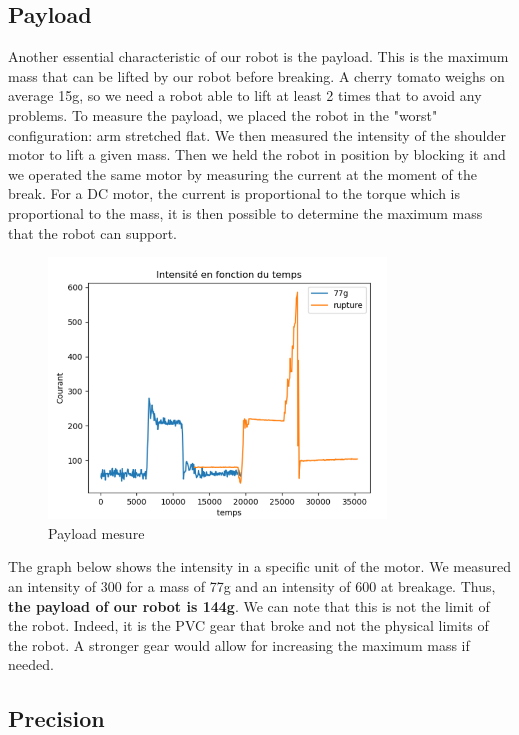 \subsection{Payload}

Another essential characteristic of our robot is the payload. This is the maximum mass that can be lifted by our robot before breaking. A cherry tomato weighs on average 15g, so we need a robot able to lift at least 2 times that to avoid any problems. To measure the payload, we placed the robot in the "worst" configuration: arm stretched flat. We then measured the intensity of the shoulder motor to lift a given mass. Then we held the robot in position by blocking it and we operated the same motor by measuring the current at the moment of the break. For a DC motor, the current is proportional to the torque which is proportional to the mass, it is then possible to determine the maximum mass that the robot can support. 
\begin{figure}[ht]
    \centering
    \includegraphics[width=0.8\textwidth]{Images/Section04/payload.png}
    \caption{Payload mesure}
    \label{fig:Payload}
\end{figure}
\FloatBarrier

The graph below shows the intensity in a specific unit of the motor. We measured an intensity of 300 for a mass of 77g and an intensity of 600 at breakage. Thus, \textbf{the payload of our robot is 144g}. We can note that this is not the limit of the robot. Indeed, it is the PVC gear that broke and not the physical limits of the robot. A stronger gear would allow for increasing the maximum mass if needed.

\subsection{Precision}

